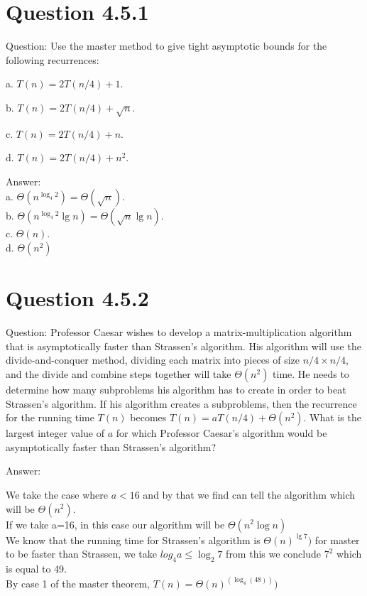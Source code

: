 \documentclass[12pt]{article}
\begin{document}
\section{Question 4.5.1}
Question: Use the master method to give tight asymptotic bounds for the following recurrences:

a. $T(n) = 2T(n / 4) + 1$.

b. $T(n) = 2T(n / 4) + \sqrt n$.

c. $T(n) = 2T(n / 4) + n$.

d. $T(n) = 2T(n / 4) + n^2$.

Answer:\\

a. $\Theta(n^{\log_4 2}) = \Theta(\sqrt n)$.\\

b. $\Theta(n^{\log_4 2}\lg n) = \Theta(\sqrt n\lg n)$.\\

c. $\Theta(n)$.\\

d. $\Theta(n^2)$\\


\section{Question 4.5.2}

Question: Professor Caesar wishes to develop a matrix-multiplication algorithm that is asymptotically faster than Strassen's algorithm. His algorithm will use the divide-and-conquer method, dividing each matrix into pieces of size $n / 4 \times n / 4$, and the divide and combine steps together will take $\Theta(n^2)$ time. He needs to determine how many subproblems his algorithm has to create in order to beat Strassen's algorithm. If his algorithm creates a subproblems, then the recurrence for the running time $T(n)$ becomes $T(n) = aT(n / 4) + \Theta(n^2)$. What is the largest integer value of $a$ for which Professor Caesar's algorithm would be asymptotically faster than Strassen's algorithm?

Answer: 

We take the case where $a<16$ and by that we find can tell the algorithm which will be $\Theta(n^2)$.\\
If we take a=16, in this case our algorithm will be $\Theta(n^2\log{n})$\\
We know that the running time for Strassen's algorithm is $\Theta(n)^{\lg{7}})$ for master to be faster than Strassen, we take $log_{4} a \le \log_{2} 7$ from this we conclude $7^2$ which is equal to 49.\\
By case 1 of the master theorem, $T(n) = \Theta (n)^(\log_{4}(48)))$\\
\end{document}

